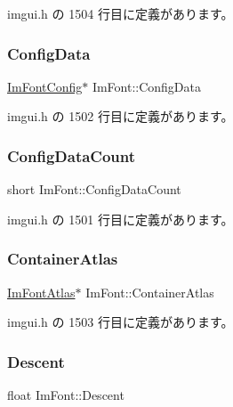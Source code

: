  imgui.\+h の 1504 行目に定義があります。

\mbox{\label{struct_im_font_afa4eb6cfb979ffa120e9795f328623a1}} 
\subsubsection{\texorpdfstring{Config\+Data}{ConfigData}}
{\footnotesize\ttfamily \mbox{\hyperlink{struct_im_font_config}{Im\+Font\+Config}}$\ast$ Im\+Font\+::\+Config\+Data}



 imgui.\+h の 1502 行目に定義があります。

\mbox{\label{struct_im_font_a4a30fc7711d628ad582ccb3188a51ddd}} 
\subsubsection{\texorpdfstring{Config\+Data\+Count}{ConfigDataCount}}
{\footnotesize\ttfamily short Im\+Font\+::\+Config\+Data\+Count}



 imgui.\+h の 1501 行目に定義があります。

\mbox{\label{struct_im_font_a8a5e0df6be5e3cabe91ae830524db960}} 
\subsubsection{\texorpdfstring{Container\+Atlas}{ContainerAtlas}}
{\footnotesize\ttfamily \mbox{\hyperlink{struct_im_font_atlas}{Im\+Font\+Atlas}}$\ast$ Im\+Font\+::\+Container\+Atlas}



 imgui.\+h の 1503 行目に定義があります。

\mbox{\label{struct_im_font_abcca12aa908bf7105433e7db6088a5e5}} 
\subsubsection{\texorpdfstring{Descent}{Descent}}
{\footnotesize\ttfamily float Im\+Font\+::\+Descent}



